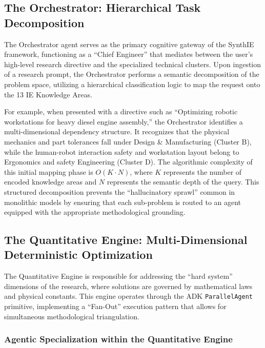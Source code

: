 \documentclass[12pt,a4paper]{article}
\begin{document}
\subsection{The Orchestrator: Hierarchical Task Decomposition}

The Orchestrator agent serves as the primary cognitive gateway of the SynthIE framework, functioning as a ``Chief Engineer'' that mediates between the user's high-level research directive and the specialized technical clusters. Upon ingestion of a research prompt, the Orchestrator performs a semantic decomposition of the problem space, utilizing a hierarchical classification logic to map the request onto the 13 IE Knowledge Areas.

For example, when presented with a directive such as ``Optimizing robotic workstations for heavy diesel engine assembly,'' the Orchestrator identifies a multi-dimensional dependency structure. It recognizes that the physical mechanics and part tolerances fall under Design \& Manufacturing (Cluster B), while the human-robot interaction safety and workstation layout belong to Ergonomics and safety Engineering (Cluster D). The algorithmic complexity of this initial mapping phase is $O(K \cdot N)$, where $K$ represents the number of encoded knowledge areas and $N$ represents the semantic depth of the query. This structured decomposition prevents the ``hallucinatory sprawl'' common in monolithic models by ensuring that each sub-problem is routed to an agent equipped with the appropriate methodological grounding.

\subsection{The Quantitative Engine: Multi-Dimensional Deterministic Optimization}

The Quantitative Engine is responsible for addressing the ``hard system'' dimensions of the research, where solutions are governed by mathematical laws and physical constants. This engine operates through the ADK \texttt{ParallelAgent} primitive, implementing a ``Fan-Out'' execution pattern that allows for simultaneous methodological triangulation.

\subsubsection{Agentic Specialization within the Quantitative Engine}
\end{document}
